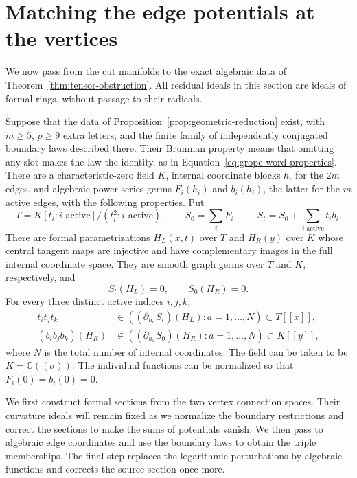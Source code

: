 \section{Matching the edge potentials at the vertices}
\label{sec:vertices}

We now pass from the cut manifolds to the exact algebraic data of
Theorem~\ref{thm:tensor-obstruction}.  All residual ideals in this section are
ideals of formal rings, without passage to their radicals.

\begin{proposition}
\label{prop:vertex-data}
Suppose that the data of Proposition~\ref{prop:geometric-reduction} exist,
with $m\geq 5$, $p\geq9$ extra letters, and the finite family of
independently conjugated boundary laws described there.  Their Brunnian
property means that omitting any slot makes the law the identity, as in
Equation~\eqref{eq:grope-word-properties}.
There are a characteristic-zero field $K$, internal coordinate blocks $h_i$
for the $2m$ edges, and algebraic power-series germs $F_i(h_i)$ and $b_i(h_i)$,
the latter for the $m$ active edges, with the following properties.
Put
\[
 T=K[t_i:i\text{ active}]/(t_i^2:i\text{ active}),\qquad
 S_0=\sum_i F_i,
 \qquad S_t=S_0+\sum_{i\text{ active}}t_i b_i.
\]
There are formal parametrizations $H_L(x,t)$ over $T$ and $H_R(y)$ over $K$
whose central tangent maps are injective and have complementary images in
the full internal coordinate space.  They are smooth graph germs over $T$
and $K$, respectively, and
\begin{equation}
\label{eq:vertex-final-vanishing}
 S_t(H_L)=0,\qquad S_0(H_R)=0.
\end{equation}
For every three distinct active indices $i,j,k$,
\begin{align}
 t_i t_j t_k
 &\in\left((\partial_{h_a}S_t)(H_L):a=1,\ldots,N\right)
       \subset T[[x]],                                      \label{eq:vertex-final-source}\\
 (b_i b_j b_k)(H_R)
 &\in\left((\partial_{h_a}S_0)(H_R):a=1,\ldots,N\right)
       \subset K[[y]],                                      \label{eq:vertex-final-target}
\end{align}
where $N$ is the total number of internal coordinates.  The field can be
taken to be $K=\mathbb C((\sigma))$.  The individual functions can be
normalized so that $F_i(0)=b_i(0)=0$.
\end{proposition}

We first construct formal sections from the two vertex connection spaces.
Their curvature ideals will remain fixed as we normalize the boundary
restrictions and correct the sections to make the sums of potentials
vanish.  We then pass to algebraic edge coordinates and use the boundary
laws to obtain the triple memberships.  The final step replaces the
logarithmic perturbations by algebraic functions and corrects the source
section once more.


